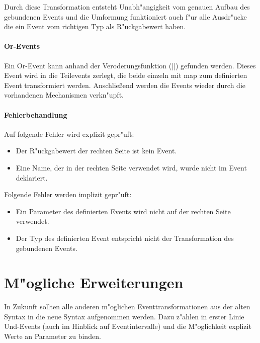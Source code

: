 \documentclass[a4paper,11pt,parskip=half]{scrartcl}
\begin{document}
Durch diese Transformation entsteht Unabh"angigkeit vom genauen Aufbau des gebundenen Events und die Umformung funktioniert auch f"ur alle Ausdr"ucke die ein Event vom richtigen Typ als R"uckgabewert haben.

\paragraph{Or-Events}
Ein Or-Event kann anhand der Veroderungsfunktion (||) gefunden werden.
Dieses Event wird in die Teilevents zerlegt, die beide einzeln mit map zum definierten Event transformiert werden.
Anschlie{\ss}end werden die Events wieder durch die vorhandenen Mechanismen verkn"upft.

\paragraph{Fehlerbehandlung}
Auf folgende Fehler wird explizit gepr"uft:
\begin{itemize}
  \item Der R"uckgabewert der rechten Seite ist kein Event.
  \item Eine Name, der in der rechten Seite verwendet wird, wurde nicht im Event deklariert.
\end{itemize}
Folgende Fehler werden implizit gepr"uft:
\begin{itemize}
  \item Ein Parameter des definierten Events wird nicht auf der rechten Seite verwendet.
  \item Der Typ des definierten Event entspricht nicht der Transformation des gebundenen Events.
\end{itemize}



\section{M"ogliche Erweiterungen}
In Zukunft sollten alle anderen m"oglichen Eventtransformationen aus der alten Syntax in die neue Syntax aufgenommen werden.
Dazu z"ahlen in erster Linie Und-Events (auch im Hinblick auf Eventintervalle) und die M"oglichkeit explizit Werte an Parameter zu binden.
\end{document}
